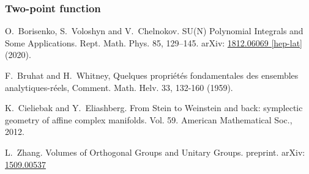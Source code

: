 \documentclass[a4paper,11pt]{article}
\theoremstyle{definition}
\begin{document}
\subsubsection{Two-point function}
\begin{thebibliography}{99}
   O.\ Borisenko, S.\  Voloshyn and V.\ Chelnokov. SU(N) Polynomial Integrals and Some Applications. Rept. Math. Phys. 85, 129–145. arXiv: \href{https://arxiv.org/abs/1812.06069}{1812.06069 [hep-lat]} (2020).

   F.\ Bruhat and H.\ Whitney, Quelques propri\'et\'es fondamentales des ensembles analytiques-r\'eels, Comment. Math. Helv. 33, 132-160 (1959).

   K.\ Cieliebak and Y.\ Eliashberg. From Stein to Weinstein and back: symplectic geometry of affine complex manifolds. Vol. 59. American Mathematical Soc., 2012.

   L.\ Zhang. Volumes of Orthogonal Groups and Unitary Groups. preprint. arXiv: \href{https://arxiv.org/abs/1509.00537v5}{1509.00537}
\end{thebibliography}
\end{document}
